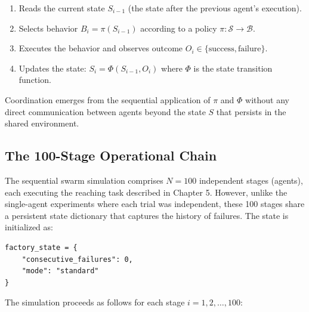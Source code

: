 \documentclass[12pt,a4paper,oneside]{report}
\begin{document}
\begin{enumerate}
    \item Reads the current state $S_{i-1}$ (the state after the previous agent's execution).
    \item Selects behavior $B_i = \pi(S_{i-1})$ according to a policy $\pi: \mathcal{S} \rightarrow \mathcal{B}$.
    \item Executes the behavior and observes outcome $O_i \in \{\text{success}, \text{failure}\}$.
    \item Updates the state: $S_i = \Phi(S_{i-1}, O_i)$ where $\Phi$ is the state transition function.
\end{enumerate}

Coordination emerges from the sequential application of $\pi$ and $\Phi$ without any direct communication between agents beyond the state $S$ that persists in the shared environment.

\subsection{The 100-Stage Operational Chain}

The sequential swarm simulation comprises $N = 100$ independent stages (agents), each executing the reaching task described in Chapter 5. However, unlike the single-agent experiments where each trial was independent, these 100 stages share a persistent state dictionary that captures the history of failures. The state is initialized as:

\begin{verbatim}
factory_state = {
    "consecutive_failures": 0,
    "mode": "standard"
}
\end{verbatim}

The simulation proceeds as follows for each stage $i = 1, 2, \ldots, 100$:
\end{document}
